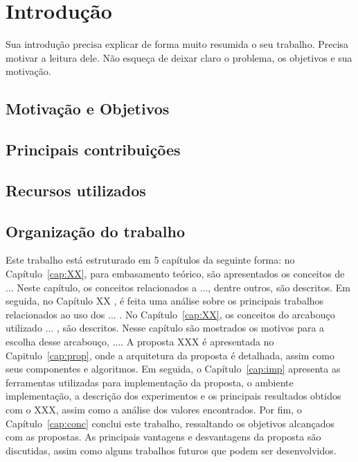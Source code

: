 \chapter{Introdução} \label{cap:int}

Sua introdução precisa explicar de forma muito resumida o seu trabalho. Precisa motivar a leitura dele. Não esqueça de deixar claro o problema, os objetivos e sua motivação.


\section{Motivação e Objetivos}\label{sec:1_inicio}


\section{Principais contribuições}

\section{Recursos utilizados}

\section{Organização do trabalho}\label{sec:1_org}

Este trabalho está estruturado em 5 capítulos da seguinte forma: no Capítulo~\ref{cap:XX}, para embasamento teórico, são apresentados os conceitos de ... Neste capítulo, os conceitos relacionados a ..., dentre outros, são descritos. Em seguida, no Capítulo XX , é feita uma análise sobre os principais trabalhos relacionados ao uso dos ... . No Capítulo~\ref{cap:XX}, os conceitos do arcabouço utilizado ... , são descritos. Nesse capítulo são mostrados os motivos para a escolha desse arcabouço, .... A proposta XXX é apresentada no Capitulo~\ref{cap:prop}, onde a arquitetura da proposta é detalhada, assim como seus componentes e algoritmos. Em seguida, o Capítulo~\ref{cap:imp} apresenta as ferramentas utilizadas para implementação da proposta, o ambiente implementação, a descrição dos experimentos e os principais resultados obtidos com o XXX, assim como a análise dos valores encontrados. Por fim, o Capítulo~\ref{cap:conc} conclui este trabalho, ressaltando os objetivos alcançados com as propostas. As principais vantagens e desvantagens da proposta são discutidas, assim como alguns trabalhos futuros que podem ser desenvolvidos. 

